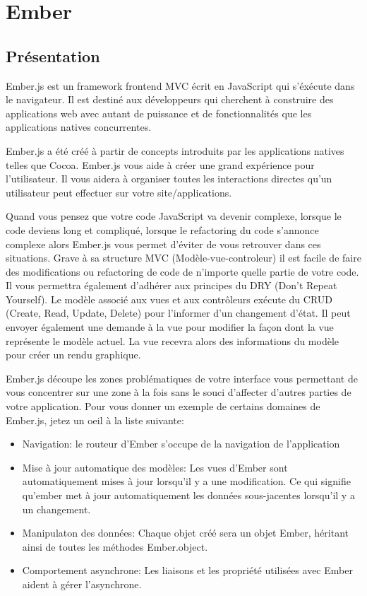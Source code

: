 \section{Ember}
\label{ch:ember}

\subsection{Présentation}


Ember.js est un framework frontend MVC écrit en JavaScript qui s’éxécute dans le navigateur. Il est destiné aux développeurs qui cherchent à construire des applications web avec autant de puissance et de fonctionnalités que les applications natives concurrentes.

Ember.js a été créé à partir de concepts introduits par les applications natives telles que Cocoa. Ember.js vous aide à créer une grand expérience pour l’utilisateur. Il vous aidera à organiser toutes les interactions directes qu’un utilisateur peut effectuer sur votre site/applications.

Quand vous pensez que votre code JavaScript va devenir complexe, lorsque le code deviens long et compliqué, lorsque le refactoring du code s'annonce complexe alors Ember.js vous permet d'éviter de vous retrouver dans ces situations. Grave à sa structure MVC (Modèle-vue-controleur) il est facile de faire des modifications ou refactoring de code de n’importe quelle partie de votre code. Il vous permettra également d’adhérer aux principes du DRY (Don’t Repeat Yourself). Le modèle associé aux vues et aux contrôleurs exécute du CRUD (Create, Read, Update, Delete) pour l’informer d’un changement d’état. Il peut envoyer également une demande à la vue pour modifier la façon dont la vue représente le modèle actuel. La vue recevra alors des informations du modèle pour créer un rendu graphique.

Ember.js découpe les zones problématiques de votre interface vous permettant de vous concentrer sur une zone à la fois sans le souci d’affecter d’autres parties de votre application. Pour vous donner un exemple de certains domaines de Ember.js, jetez un oeil à la liste suivante:

\begin{itemize}

  \item[\textbullet]
  Navigation: le routeur d’Ember s’occupe de la navigation de l'application

  \item[\textbullet]
  Mise à jour automatique des modèles: Les vues d’Ember sont automatiquement mises à jour lorsqu’il y a une modification. Ce qui signifie qu’ember met à jour automatiquement les données sous-jacentes lorsqu'il y a un changement.

  \item[\textbullet]
  Manipulaton des données: Chaque objet créé sera un objet Ember, héritant ainsi de toutes les méthodes Ember.object.

  \item[\textbullet]
  Comportement asynchrone: Les liaisons et les propriété utilisées avec Ember aident à gérer l’asynchrone.

\end{itemize}

